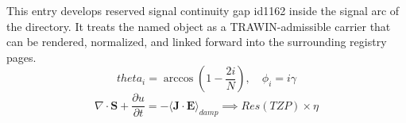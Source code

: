 
\begin{tzpsnapshot}
\end{tzpsnapshot}

This entry develops reserved signal continuity gap id1162 inside the signal arc of the directory. It treats the named object as a TRAWIN-admissible carrier that can be rendered, normalized, and linked forward into the surrounding registry pages.
\[
theta_i = \arccos(1 - \frac{2i}{N}), \quad \phi_i = i\gamma
\]
\[
\nabla \cdot \mathbf{S} + \frac{\partial u}{\partial t} = -\langle \mathbf{J} \cdot \mathbf{E} \rangle_{damp} \implies Res(TZP) \times \eta
\]

